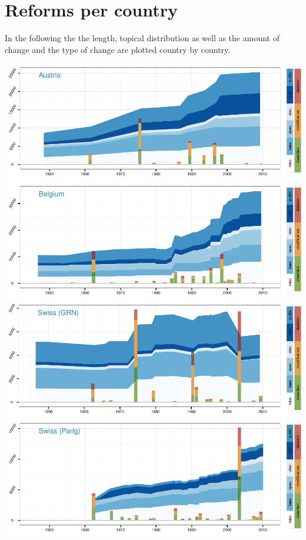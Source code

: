 \documentclass[a4paper]{article}
\begin{document}
\pagebreak{}

\section{Reforms per country}\label{reforms-per-country}

In the following the the length, topical distribution as well as the
amount of change and the type of change are plotted country by country.

\includegraphics{in_progress_files/figure-latex/unnamed-chunk-5-1.pdf}
\includegraphics{in_progress_files/figure-latex/unnamed-chunk-5-2.pdf}
\includegraphics{in_progress_files/figure-latex/unnamed-chunk-5-3.pdf}
\includegraphics{in_progress_files/figure-latex/unnamed-chunk-5-4.pdf}
\end{document}
